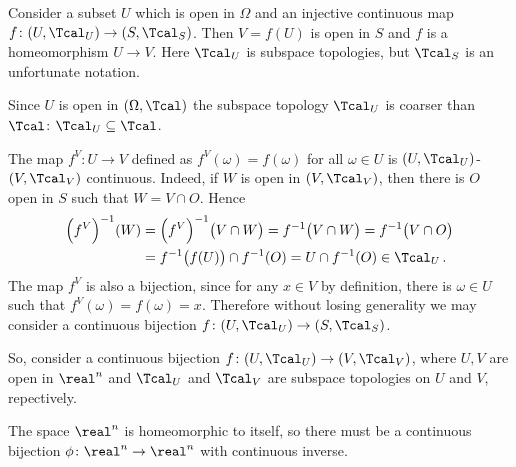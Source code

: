 
Consider a subset $U$ which is open in $\Omega$ and an injective continuous map
$f\colon (U, \Tcal_U) \to (S, \Tcal_S)$. Then $V = f(U)$ is open in $S$ and $f$
is a homeomorphism $U \to V$. Here $\Tcal_U$ is subspace topologies, but $\Tcal_S$
is an unfortunate notation.

Since $U$ is open in $(\Omega, \Tcal)$ the subspace topology $\Tcal_U$ is coarser
than $\Tcal$: $\Tcal_U \subseteq \Tcal$.

The map $f^V \colon U \to V$ defined as $f^V(\omega) = f(\omega)$ for all $\omega
\in U$ is $(U, \Tcal_U)$-$(V, \Tcal_V)$ continuous. Indeed, if $W$ is open in
$(V, \Tcal_V)$, then there is $O$ open in $S$ such that $W = V \cap O$. Hence 
\begin{align*}
  \Bigl(f^V\Bigr)^{-1}(W)
    &= \Bigl(f^V\Bigr)^{-1}\bigl(V \cap W\bigr)
    = f^{-1}\bigl(V\cap W\bigr)
    = f^{-1}\bigl(V\cap O\bigr)
    \\
    &= f^{-1}\bigl(f(U)\bigr) \cap f^{-1}(O)
    = U \cap f^{-1}(O)
    \in \Tcal_U
  \,.
\end{align*}
The map $f^V$ is also a bijection, since for any $x\in V$ by definition, there is
$\omega \in U$ such that $f^V(\omega) = f(\omega) = x$. Therefore without losing
generality we may consider a continuous bijection $f\colon (U, \Tcal_U) \to (S, \Tcal_S)$.

So, consider a continuous bijection $f\colon (U, \Tcal_U) \to (V, \Tcal_V)$, where
$U, V$ are open in $\real^n$ and $\Tcal_U$ and $\Tcal_V$ are subspace topologies on
$U$ and $V$, repectively.

The space $\real^n$ is homeomorphic to itself, so there must be a continuous bijection
$\phi\colon \real^n \to \real^n$ with continuous inverse.




